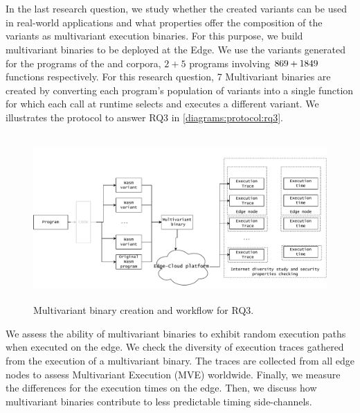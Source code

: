
\section{\rqthree}

\newcommand{\mewe}{MEWE\xspace}



In the last research question, we study whether the created variants can be used in real-world applications and what properties offer the composition of the variants as multivariant execution binaries. For this purpose, we build multivariant binaries to be deployed at the Edge. We use the variants generated for the programs of the \corpussodium and \corpusqrcode corpora, $2 + 5$ programs involving $ 869 + 1849$ functions respectively. For this research question, 7 Multivariant binaries are created by converting each program's population of variants into a single function for which each call at runtime selects and executes a different variant. We illustrates the protocol to answer RQ3 in \autoref{diagrams:protocol:rq3}.



\begin{figure}[h]
    \centering
    \includegraphics[height=2.50in]{diagrams/Rq3.pdf}
    \caption{Multivariant binary creation and workflow for RQ3.}
    \label{diagrams:protocol:rq3}
\end{figure}

We assess the ability of multivariant binaries to exhibit random execution paths when executed on the edge. We check the diversity of execution traces gathered from the execution of a multivariant binary. The traces are collected from all edge nodes to assess Multivariant Execution (MVE) worldwide. Finally, we measure the differences for the execution times on the edge. Then, we discuss how multivariant binaries contribute to less predictable timing side-channels.

